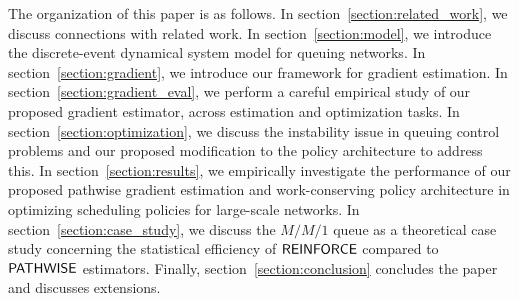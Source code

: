 The organization of this paper is as follows. In section~\ref{section:related_work}, we discuss connections with related work. In section~\ref{section:model}, we introduce the discrete-event dynamical system model for queuing networks. In section~\ref{section:gradient}, we introduce our framework for gradient estimation. In section~\ref{section:gradient_eval}, we perform a careful empirical study of our proposed gradient estimator, across estimation and optimization tasks.
In section~\ref{section:optimization}, we discuss the instability issue in queuing control problems and our proposed modification to the policy architecture to address this. In section~\ref{section:results}, we empirically investigate the performance of our proposed pathwise gradient estimation and work-conserving policy architecture in optimizing scheduling policies for large-scale networks. In section~\ref{section:case_study}, we discuss the $M/M/1$ queue as a theoretical case study concerning the statistical efficiency of $\mathsf{REINFORCE}$ compared to $\mathsf{PATHWISE}$ estimators. Finally, section~\ref{section:conclusion} concludes the paper and discusses extensions.



